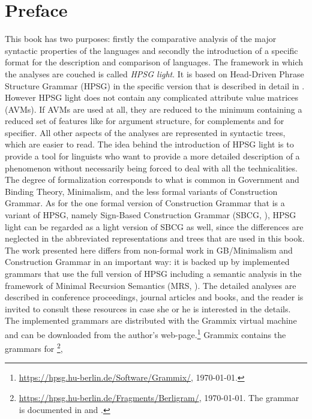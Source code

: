 \chapter{Preface}

This book has two purposes: firstly the comparative analysis of the major syntactic properties of the
 languages and secondly the introduction of a specific format for the description and
comparison of languages. The framework in which the analyses are couched is called \emph{HPSG
  light}. It is based on Head-Driven Phrase Structure Grammar (HPSG) \citep{ps,ps2,HPSGHandbook} in the specific version that is described in detail in
. However HPSG light does not contain any complicated attribute value
matrices (AVMs). If AVMs are used at all, they are reduced to the minimum containing a reduced set
of features like \argst for argument structure, \comps for complements and \spr for specifier. All
other aspects of the analyses are represented in syntactic trees, which are easier to read. The idea
behind the introduction of HPSG light is to provide a tool for linguists who want to provide a
more detailed description of a phenomenon without necessarily being forced to deal with all the
technicalities. The degree of formalization corresponds to what is common in Government and Binding
Theory, Minimalism, and the less formal variants of Construction Grammar. As for the one formal version
of Construction Grammar that is a variant of HPSG, namely Sign-Based Construction Grammar (SBCG, \citealp{Sag2012a}), HPSG
light can be regarded as a light version of SBCG as well, since the differences are neglected in the
abbreviated representations and trees that are used in this book. The work presented here differs
from non-formal work in GB/Minimalism and Construction Grammar in an important way: it is backed up
by implemented grammars that use the full version of HPSG including a semantic analysis in the
framework of Minimal Recursion Semantics (MRS, ). The detailed analyses are described in
conference proceedings, journal articles and books, and the reader is invited to consult these
resources in case she or he is interested in the details. The implemented grammars are distributed
with the Grammix virtual machine \citep{MuellerGrammix} and can be downloaded from the author's
web-page.\footnote{
\url{https://hpsg.hu-berlin.de/Software/Grammix/}, \today.} Grammix contains the grammars for
\footnote{
\url{https://hpsg.hu-berlin.de/Fragments/Berligram/}, \today. The  grammar is documented in
 and .
},
